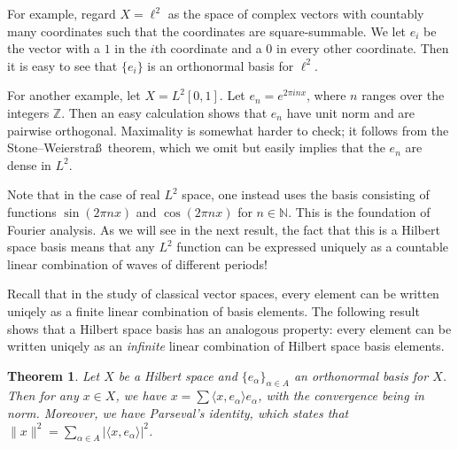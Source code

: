\documentclass[11pt,oneside]{amsbook}
\newcommand{\NN}{{\mathbb N}}
\newcommand{\ZZ}{{\mathbb Z}}
\theoremstyle{definition}
\theoremstyle{plain}
\newtheorem{thm}{Theorem}[section]
\theoremstyle{definition}
\theoremstyle{remark}
\numberwithin{equation}{section}
\numberwithin{figure}{section}
\begin{document}
For example, regard $X=\ell^2$ as the space of complex vectors with countably many coordinates such that the coordinates are square-summable. We let $e_i$ be the vector with a $1$ in the $i$th coordinate and a $0$ in every other coordinate. Then it is easy to see that $\{e_i\}$ is an orthonormal basis for $\ell^2$.

For another example, let $X=L^2[0,1]$. Let $e_n=e^{2\pi i nx}$, where $n$ ranges over the integers $\ZZ$. Then an easy calculation shows that $e_n$ have unit norm and are pairwise orthogonal. Maximality is somewhat harder to check; it follows from the Stone--Weierstra\ss\ theorem, which we omit but easily implies that the $e_n$ are dense in $L^2$.

Note that in the case of real $L^2$ space, one instead uses the basis consisting of functions $\sin(2\pi nx)$ and $\cos(2\pi nx)$ for $n\in\NN$. This is the foundation of Fourier analysis. As we will see in the next result, the fact that this is a Hilbert space basis means that any $L^2$ function can be expressed uniquely as a countable linear combination of waves of different periods!

Recall that in the study of classical vector spaces, every element can be written uniqely as a finite linear combination of basis elements. The following result shows that a Hilbert space basis has an analogous property: every element can be written uniqely as an \emph{infinite} linear combination of Hilbert space basis elements.

\begin{thm}
  Let $X$ be a Hilbert space and $\{e_\alpha\}_{\alpha\in A}$ an orthonormal basis for $X$. Then for any $x\in X$, we have $x=\sum\langle x,e_\alpha\rangle e_\alpha$, with the convergence being in norm. Moreover, we have Parseval's identity, which states that $\|x\|^2=\sum_{\alpha\in A}|\langle x,e_\alpha\rangle|^2$.
\end{thm}
\end{document}
